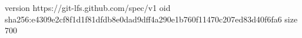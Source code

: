 version https://git-lfs.github.com/spec/v1
oid sha256:e4309e2cf8f1d1f81dfdb8e0dad9dff4a290e1b760f11470c207ed83d40f6fa6
size 700
